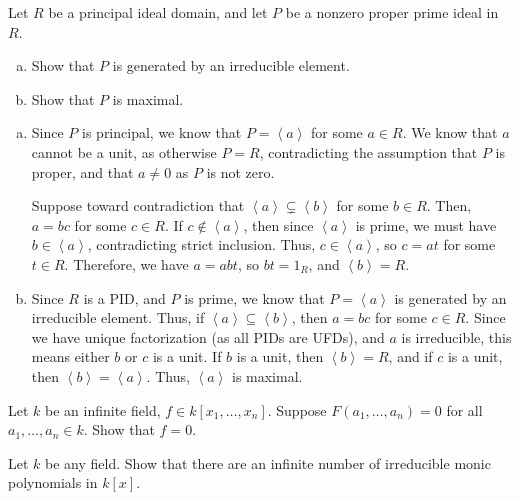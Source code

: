 \documentclass[10pt]{mypackage}
\begin{document}
\begin{exercise}[Exercise 1.3]
  Let $R$ be a principal ideal domain, and let $P$ be a nonzero proper prime ideal in $R$.
  \begin{enumerate}[(a)]
    \item Show that $P$ is generated by an irreducible element.
    \item Show that $P$ is maximal.
  \end{enumerate}
\end{exercise}
\begin{solution}\hfill
  \begin{enumerate}[(a)]
    \item Since $P$ is principal, we know that $ P = \left\langle a \right\rangle $ for some $a\in R$. We know that $a$ cannot be a unit, as otherwise $P = R$, contradicting the assumption that $P$ is proper, and that $a\neq 0$ as $P$ is not zero.\newline

      Suppose toward contradiction that $\left\langle a \right\rangle\subsetneq \left\langle b \right\rangle$ for some $b\in R$. Then, $a = bc$ for some $c\in R$. If $c\notin \left\langle a \right\rangle$, then since $\left\langle a \right\rangle$ is prime, we must have $b\in \left\langle a \right\rangle$, contradicting strict inclusion. Thus, $c\in \left\langle a \right\rangle$, so $c = at$ for some $t\in R$. Therefore, we have $a = abt$, so $bt = 1_R$, and $\left\langle b \right\rangle = R$.
    \item Since $R$ is a PID, and $P$ is prime, we know that $P = \left\langle a \right\rangle$ is generated by an irreducible element. Thus, if $\left\langle a \right\rangle\subseteq \left\langle b \right\rangle$, then $a = bc$ for some $c\in R$. Since we have unique factorization (as all PIDs are UFDs), and $a$ is irreducible, this means either $b$ or $c$ is a unit. If $b$ is a unit, then $\left\langle b  \right\rangle = R$, and if $c$ is a unit, then $\left\langle b \right\rangle = \left\langle a \right\rangle$. Thus, $\left\langle a \right\rangle$ is maximal.
  \end{enumerate}
\end{solution}
\begin{exercise}[Exercise 1.4]
Let $k$ be an infinite field, $f\in k\left[x_1,\dots,x_n\right]$. Suppose $F\left(a_1,\dots,a_n\right) = 0$ for all $a_1,\dots,a_n\in k$. Show that $f = 0$.
\end{exercise}
\begin{exercise}[Exercise 1.5]
Let $k$ be any field. Show that there are an infinite number of irreducible monic polynomials in $k\left[x\right]$.
\end{exercise}
\end{document}
